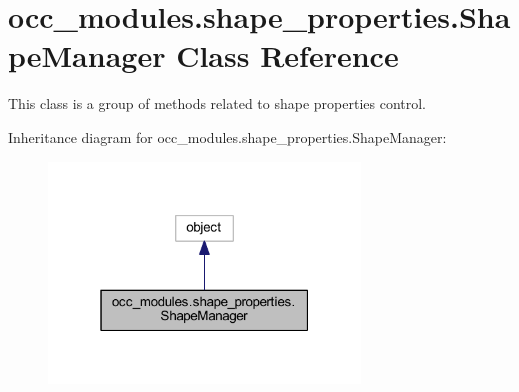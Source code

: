 \hypertarget{a00094}{}\section{occ\+\_\+modules.\+shape\+\_\+properties.\+Shape\+Manager Class Reference}
\label{a00094}


This class is a group of methods related to shape properties control.  




Inheritance diagram for occ\+\_\+modules.\+shape\+\_\+properties.\+Shape\+Manager\+:\nopagebreak
\begin{figure}[H]
\begin{center}
\leavevmode
\includegraphics[width=235pt]{a00093}
\end{center}
\end{figure}
